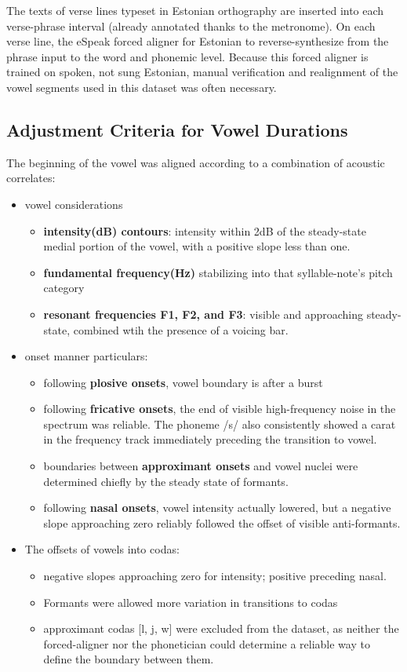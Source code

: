  
The texts of verse lines typeset in Estonian orthography are inserted into each verse-phrase interval (already annotated thanks to the metronome). On each verse line, the eSpeak forced aligner for Estonian \citep{eSpeak1995} to reverse-synthesize from the phrase input to the word and phonemic level. Because this forced aligner is trained on spoken, not sung Estonian, manual verification and realignment of the vowel segments used in this dataset was often necessary. \\

\subsection{Adjustment Criteria for Vowel Durations}
The beginning of the vowel was aligned according to a combination of acoustic correlates: 



\begin{itemize}
\item vowel considerations
\begin{itemize}
\item {\bf intensity(dB) contours}: intensity within 2dB of the steady-state medial portion of the vowel, with a positive slope less than one.
\item {\bf fundamental frequency(Hz)} stabilizing into that syllable-note's pitch category
\item {\bf resonant frequencies F1, F2, and F3}: visible and approaching steady-state, combined wtih  the presence of a voicing bar.
\end{itemize}
\item onset manner particulars: 
\begin{itemize}
\item following {\bf plosive onsets}, vowel boundary is after a burst
\item following {\bf fricative onsets},  the end of visible high-frequency noise in the spectrum was reliable. The phoneme /s/ also consistently showed a carat in the frequency track immediately preceding the transition to vowel.
\item boundaries between {\bf approximant onsets} and vowel nuclei were determined chiefly by the steady state of formants. 
\item following {\bf nasal onsets}, vowel intensity actually lowered, but a negative slope approaching zero reliably followed the offset of visible anti-formants.
\end{itemize} 
\item The offsets of vowels into codas:
\begin{itemize}
\item negative slopes approaching zero for intensity; positive preceding nasal. 
\item Formants were allowed more variation in transitions to codas
\item approximant codas {[l, j, w]} were excluded from the dataset, as neither the forced-aligner nor the phonetician could determine a reliable way to define the boundary between them.
\end{itemize} 
\end{itemize}



